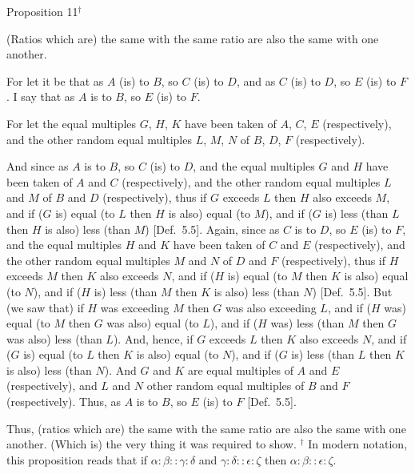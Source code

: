
\begin{center}
{\large Proposition 11}$^\dag$
\end{center}

(Ratios which are) the same with the same ratio  are also the same with one another.

\epsfysize=0.75in
\centerline{}

For let it be that as $A$ (is) to $B$, so $C$ (is) to $D$, and as $C$ (is) to $D$, so $E$ (is) to $F$. I say
that as  $A$ is to $B$, so $E$ (is) to $F$.

For let the equal multiples $G$, $H$,  $K$ have been taken of $A$, $C$,  $E$ (respectively), and
the other random equal multiples $L$, $M$,  $N$ of $B$, $D$, $F$ (respectively).

And since as $A$ is to $B$, so $C$ (is) to $D$, and the equal multiples $G$ and $H$
have been taken of $A$ and $C$ (respectively), and the other random equal
multiples $L$ and $M$ of $B$ and $D$ (respectively),  thus if $G$ exceeds $L$ then
$H$ also exceeds $M$, and if ($G$ is) equal (to $L$ then $H$ is also)
equal (to $M$), and if ($G$ is) less (than $L$ then $H$ is also) less (than $M$)  [Def.~5.5]. Again, since as $C$ is to $D$, so $E$
(is) to $F$, and the equal multiples $H$ and $K$ have been taken of $C$ and $E$
(respectively), and the other random equal multiples $M$ and $N$ of
$D$ and $F$ (respectively), thus if $H$ exceeds $M$ then
$K$ also exceeds $N$, and if ($H$ is) equal  (to $M$ then $K$ is also)
equal (to $N$), and if ($H$ is) less (than $M$  then $K$ is also) less (than $N$) [Def.~5.5]. But (we saw that) if $H$ was exceeding $M$ then $G$ was also
exceeding $L$, and if ($H$ was) equal (to $M$ then $G$ was also)
equal (to $L$), and if ($H$ was) less (than $M$ then $G$ was also) less (than $L$).
And, hence, if $G$ exceeds $L$ then
$K$ also exceeds $N$, and if ($G$ is) equal (to $L$ then $K$ is also)  equal (to $N$), and if ($G$ is) less (than $L$ then $K$ is also) less (than $N$). And $G$ and $K$ are equal multiples of $A$ and $E$ (respectively), and $L$ and $N$
other random equal multiples of $B$ and $F$ (respectively). Thus, as $A$ is to $B$,
so $E$ (is) to $F$ [Def.~5.5].

Thus, (ratios which are) the same with the same ratio  are also the same with one another. (Which is) the very thing it was required to show.
{\footnotesize \noindent$^\dag$ In modern notation, this proposition
reads that if $\alpha:\beta::\gamma:\delta$ and $\gamma:\delta::\epsilon:\zeta$ then $\alpha:\beta::\epsilon:\zeta$.}

